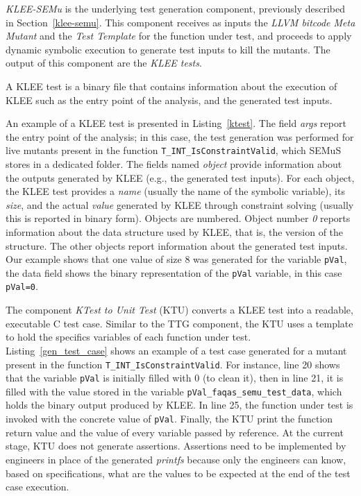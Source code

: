 

\emph{KLEE-SEMu} is the underlying test generation component, previously described in Section~\ref{klee-semu}. This component receives as inputs the \emph{LLVM bitcode Meta Mutant} and the \emph{Test Template} for the function under test, and proceeds to apply dynamic symbolic execution to generate test inputs to kill the mutants. The output of this component are the \emph{KLEE tests}.

A KLEE test is a binary file that contains information about the execution of KLEE such as the entry point of the analysis, and the generated test inputs.

An example of a KLEE test is presented in Listing~\ref{ktest}. The field \emph{args} report the entry point of the analysis; in this case, the test generation was performed for live mutants present in the function \texttt{T\_INT\_IsConstraintValid}, which SEMuS stores in a dedicated folder. The fields named \emph{object} provide information about the outputs generated by KLEE (e.g., the generated test inputs). 
For each object, the KLEE test provides a \emph{name} (usually the name of the symbolic variable), its \emph{size}, and the actual \emph{value} generated by KLEE through constraint solving (usually this is reported in binary form).
Objects are numbered. Object number \emph{0} reports information about the data structure used by KLEE, that is, the version of the structure. The other objects report information about the generated test inputs.
Our example shows that one value of size 8 was generated for the variable \texttt{pVal}, the data field shows the binary representation of the \texttt{pVal} variable, in this case \texttt{pVal=0}.





The component \emph{KTest to Unit Test} (KTU) converts a KLEE test into a readable, executable C test case. Similar to the TTG component, the KTU uses a template to hold the specifics variables of each function under test. 
Listing~\ref{gen_test_case} shows an example of a test case generated for a mutant present in the function \texttt{T\_INT\_IsConstraintValid}. For instance, line 20 shows that the variable \texttt{pVal} is initially filled with 0 (to clean it), then in line 21, it is filled with the value stored in the variable \texttt{pVal\_faqas\_semu\_test\_data}, which holds the binary output produced by KLEE. In line 25, the function under test is invoked with the concrete value of \texttt{pVal}. Finally, the KTU print the function return value and the value of every variable passed by reference.
At the current stage, KTU does not generate assertions. Assertions need to be implemented by engineers in place of the generated \emph{printfs} because only the engineers can know, based on specifications, what are the values to be expected at the end of the test case execution.


\ENDCHANGEDWPT
